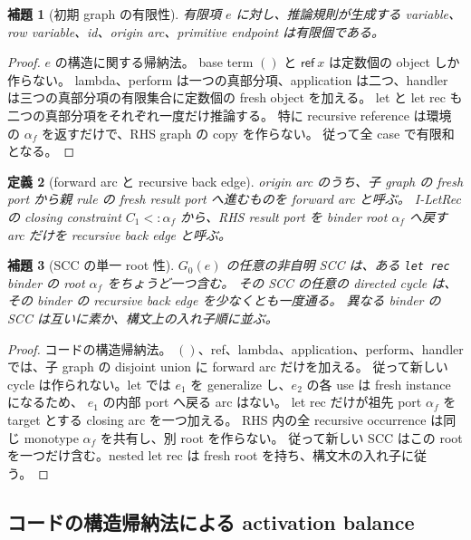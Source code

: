 \documentclass[uplatex,dvipdfmx,a4paper,10.5pt]{jsarticle}
\theoremstyle{jpplain}
\newtheorem{definition}{定義}[section]
\newtheorem{lemma}[definition]{補題}
\newcommand{\kw}[1]{\mathsf{#1}}
\begin{document}
\begin{lemma}[初期 graph の有限性]\label{lem:initial-finite}
有限項 $e$ に対し、推論規則が生成する variable、row variable、id、origin arc、primitive endpoint は有限個である。
\end{lemma}

\begin{proof}
$e$ の構造に関する帰納法。
base term $()$ と $\kw{ref}\ x$ は定数個の object しか作らない。
lambda、perform は一つの真部分項、application は二つ、handler は三つの真部分項の有限集合に定数個の fresh object を加える。
let と let rec も二つの真部分項をそれぞれ一度だけ推論する。
特に recursive reference は環境の $\alpha_f$ を返すだけで、RHS graph の copy を作らない。
従って全 case で有限和となる。
\end{proof}

\begin{definition}[forward arc と recursive back edge]
origin arc のうち、子 graph の fresh port から親 rule の fresh result port へ進むものを forward arc と呼ぶ。
I-LetRec の closing constraint $C_1<:\alpha_f$ から、RHS result port を binder root $\alpha_f$ へ戻す arc だけを
recursive back edge と呼ぶ。
\end{definition}

\begin{lemma}[SCC の単一 root 性]\label{lem:single-root-scc}
$G_0(e)$ の任意の非自明 SCC は、ある \texttt{let rec} binder の root $\alpha_f$ をちょうど一つ含む。
その SCC の任意の directed cycle は、その binder の recursive back edge を少なくとも一度通る。
異なる binder の SCC は互いに素か、構文上の入れ子順に並ぶ。
\end{lemma}

\begin{proof}
コードの構造帰納法。
$()$、ref、lambda、application、perform、handler では、子 graph の disjoint union に forward arc だけを加える。
従って新しい cycle は作られない。let では $e_1$ を generalize し、$e_2$ の各 use は fresh instance になるため、
$e_1$ の内部 port へ戻る arc はない。
let rec だけが祖先 port $\alpha_f$ を target とする closing arc を一つ加える。
RHS 内の全 recursive occurrence は同じ monotype $\alpha_f$ を共有し、別 root を作らない。
従って新しい SCC はこの root を一つだけ含む。nested let rec は fresh root を持ち、構文木の入れ子に従う。
\end{proof}

\subsection{コードの構造帰納法による activation balance}
\end{document}
